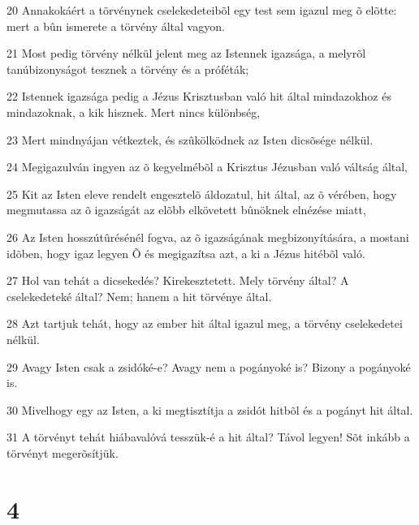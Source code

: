 \par 20 Annakokáért a törvénynek cselekedeteibõl egy test sem igazul meg õ elõtte: mert a bûn ismerete  a törvény által vagyon.
\par 21 Most pedig törvény nélkül jelent meg az Istennek igazsága, a melyrõl tanúbizonyságot tesznek a törvény és a próféták;
\par 22 Istennek igazsága pedig a Jézus Krisztusban való hit által mindazokhoz és mindazoknak, a kik hisznek. Mert nincs különbség,
\par 23 Mert mindnyájan vétkeztek, és szûkölködnek az Isten dicsõsége nélkül.
\par 24 Megigazulván ingyen az õ kegyelmébõl a Krisztus Jézusban való váltság által,
\par 25 Kit az Isten eleve rendelt engesztelõ áldozatul, hit által, az õ vérében, hogy megmutassa az õ igazságát az elõbb elkövetett bûnöknek elnézése miatt,
\par 26 Az Isten hosszútûrésénél fogva, az õ igazságának megbizonyítására, a mostani idõben, hogy igaz legyen Õ és megigazítsa azt, a ki a Jézus hitébõl való.
\par 27 Hol van tehát a dicsekedés? Kirekesztetett. Mely törvény által? A cselekedeteké által? Nem; hanem a hit törvénye által.
\par 28 Azt tartjuk tehát, hogy az ember hit által igazul meg, a törvény cselekedetei nélkül.
\par 29 Avagy Isten csak a zsidóké-e? Avagy nem a pogányoké is? Bizony a pogányoké is.
\par 30 Mivelhogy egy az Isten, a ki megtisztítja a zsidót hitbõl és a pogányt hit által.
\par 31 A törvényt tehát hiábavalóvá tesszük-é a hit által? Távol legyen! Sõt inkább a törvényt megerõsítjük.

\chapter{4}

